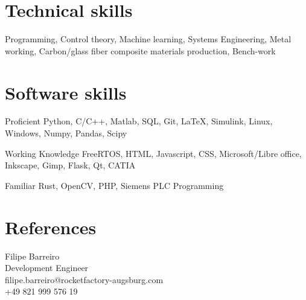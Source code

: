 \documentclass{tccv}
\begin{document}
\section{Technical skills}

Programming, Control theory, Machine learning, Systems Engineering, Metal working, Carbon/glass fiber composite materials production, Bench-work


\section{Software skills}

\begin{factlist}

\item{Proficient}
     {Python, C/C++, Matlab, SQL, Git, \LaTeX, Simulink, Linux, Windows, Numpy, Pandas, Scipy}

\item{Working Knowledge}
     {FreeRTOS, HTML, Javascript, CSS, Microsoft/Libre office, Inkscape, Gimp, Flask, Qt, CATIA}

\item{Familiar}
     {Rust, OpenCV, PHP, Siemens PLC Programming}

\end{factlist}

\section{References}
Filipe Barreiro\\
Development Engineer\\
filipe.barreiro@rocketfactory-augsburg.com\\
+49 821 999 576 19


\newpage
\onecolumn
\end{document}
